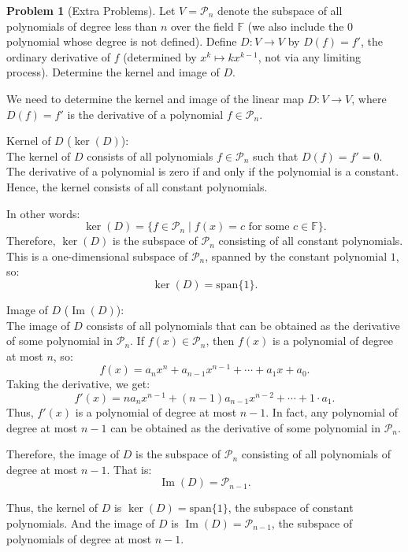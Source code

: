 \documentclass[12pt]{article}
\theoremstyle{definition}
\newtheorem{problem}{Problem}
\begin{document}
\begin{problem}[Extra Problems]
    Let $V = \mathcal{P}_n$ denote the subspace of all polynomials of degree less than $n$ over the field $\mathbb{F}$ (we also include the 0 polynomial whose degree is not defined). 
    Define $D: V \rightarrow V$ by $D(f) = f'$, the ordinary derivative of $f$ (determined by $x^k \longmapsto kx^{k-1}$, not via any limiting process). Determine the kernel and image of $D$.

    \begin{solution}
        We need to determine the kernel and image of the linear map \( D: V \to V \), where \( D(f) = f' \) is the derivative of a polynomial \( f \in \mathcal{P}_n \).

        Kernel of \( D \) (\( \ker(D) \)):\\
        The kernel of \( D \) consists of all polynomials \( f \in \mathcal{P}_n \) such that \( D(f) = f' = 0 \). The derivative of a polynomial is zero if and only if the polynomial is a constant. Hence, the kernel consists of all constant polynomials.
    
        In other words:
        \[\ker(D) = \{ f \in \mathcal{P}_n \mid f(x) = c \text{ for some } c \in \mathbb{F} \}.\]
        Therefore, \( \ker(D) \) is the subspace of \( \mathcal{P}_n \) consisting of all constant polynomials. This is a one-dimensional subspace of \( \mathcal{P}_n \), spanned by the constant polynomial \( 1 \), so:
        \[\ker(D) = \mathrm{span}\{1\}.\]
    
        Image of \( D \) (\( \operatorname{Im}(D) \)):\\
        The image of \( D \) consists of all polynomials that can be obtained as the derivative of some polynomial in \( \mathcal{P}_n \). If \( f(x) \in \mathcal{P}_n \), then \( f(x) \) is a polynomial of degree at most \( n \), so:
        \[f(x) = a_n x^n + a_{n-1} x^{n-1} + \cdots + a_1 x + a_0.\]
        Taking the derivative, we get:
        \[f'(x) = n a_n x^{n-1} + (n-1) a_{n-1} x^{n-2} + \cdots + 1 \cdot a_1.\]
        Thus, \( f'(x) \) is a polynomial of degree at most \( n-1 \). In fact, any polynomial of degree at most \( n-1 \) can be obtained as the derivative of some polynomial in \( \mathcal{P}_n \).
    
        Therefore, the image of \( D \) is the subspace of \( \mathcal{P}_n \) consisting of all polynomials of degree at most \( n-1 \). That is:
        \[\operatorname{Im}(D) = \mathcal{P}_{n-1}.\]
        
        Thus, the kernel of \( D \) is \( \ker(D) = \mathrm{span}\{1\} \), the subspace of constant polynomials. And the image of \( D \) is \( \operatorname{Im}(D) = \mathcal{P}_{n-1} \), the subspace of polynomials of degree at most \( n-1 \).
    \end{solution}
\end{problem}
\end{document}
